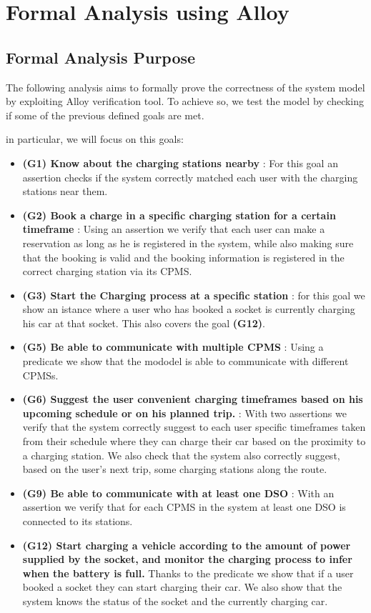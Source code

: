 \documentclass[table, 12pt]{article} %
\begin{document}
    \newpage
    \section{Formal Analysis using Alloy}
    \subsection{Formal Analysis Purpose}
    The following analysis aims to formally prove the correctness of the system model by exploiting Alloy verification tool. To achieve so, we test the model by checking if some of the previous defined goals are met. 

    in particular, we will focus on this goals:
    \begin{itemize}
        \item \textbf{(G1) Know about the charging stations nearby }: For this goal an assertion checks if the system correctly matched each user with the charging stations near them. 
        \item \textbf{(G2) Book a charge in a specific charging station for a certain timeframe }: Using an assertion we verify that each user can make a reservation as long as he is registered in the system, while also making sure that the booking is valid and the booking information is registered in the correct charging station via its CPMS.
        \item \textbf{(G3) Start the Charging process at a specific station }: for this goal we show an istance where a user who has booked a socket is currently charging his car at that socket. This also covers the goal \textbf{(G12)}.
        \item \textbf{(G5) Be able to communicate with multiple CPMS }: Using a predicate we show that the mododel is able to communicate with different CPMSs.
        \item \textbf{(G6) Suggest the user convenient charging timeframes based on his upcoming schedule or on his planned trip. }: With two assertions we verify that the system correctly suggest to each user specific timeframes taken from their schedule where they can charge their car based on the proximity to a charging station. We also check that the system also correctly suggest, based on the user's next trip, some charging stations along the route.
        \item \textbf{(G9) Be able to communicate with at least one DSO }: With an assertion we verify that for each CPMS in the system at least one DSO is connected to its stations. 
        \item \textbf{(G12) Start charging a vehicle according to the amount of power supplied by the socket, and monitor the charging process to infer when the battery is full. } Thanks to the predicate we show that if a user booked a socket they can start charging their car. We also show that the system knows the status of the socket and the currently charging car.

\end{itemize}
\end{document}
